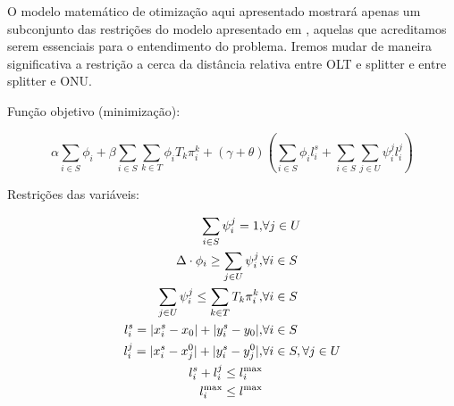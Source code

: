 \documentclass[12pt]{article}
\begin{document}
O modelo matemático de otimização aqui apresentado mostrará apenas um subconjunto das restrições do modelo apresentado em \cite{optpon}, aquelas que acreditamos serem essenciais para o entendimento do problema. Iremos mudar de maneira significativa a restrição a cerca da distância relativa entre OLT e splitter e entre splitter e ONU.

Função objetivo (minimização): 

\begin{equation}
\alpha \sum_{i\in S} \phi_i + \beta \sum_{i\in S}\sum_{k \in T} \phi_i T_k \pi_i^k + (\gamma + \theta)\left (\sum_{i\in S} \phi_i l_i^s +\sum_{i\in S} \sum_{j\in U} \psi_i^jl_i^j \right )
\end{equation}

Restrições das variáveis:

\begin{eqnarray}
\sum_{i \in S} \psi_i^j = 1, &\forall j \in U\label{eq:rest4}\\
\Delta \cdot \phi_i \ge \sum_{j\in U} \psi_i^j, &\forall i \in S\label{eq:rest5}\\
\sum_{j\in U} \psi_i^j \le \sum_{k \in T} T_k\pi_i^k, &\forall i \in S\label{eq:rest6}\\
l_i^s = |x_i^s - x_0| + |y_i^s - y_0|, &\forall i \in S\label{eq:rest1}\\
l_i^j = |x_i^s - x_j^0| + |y_i^s - y_j^0|, &\forall i \in S, \forall j \in U\label{eq:rest2}\\
l_i^s + l_i^j \le l^{{\rm max}}_i\label{eq:rest3}\\
l_i^{{\rm max}} \le l^{\rm max}\label{eq:rest7}
\end{eqnarray}
\end{document}
